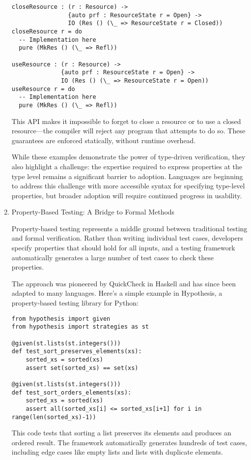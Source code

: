 \documentclass[11pt]{article}
\begin{document}
\begin{enumerate}
\begin{verbatim}
closeResource : (r : Resource) -> 
                {auto prf : ResourceState r = Open} -> 
                IO (Res () (\_ => ResourceState r = Closed))
closeResource r = do
  -- Implementation here
  pure (MkRes () (\_ => Refl))

useResource : (r : Resource) -> 
              {auto prf : ResourceState r = Open} -> 
              IO (Res () (\_ => ResourceState r = Open))
useResource r = do
  -- Implementation here
  pure (MkRes () (\_ => Refl))
\end{verbatim}

This API makes it impossible to forget to close a resource or to use a closed resource—the compiler will reject any program that attempts to do so. These guarantees are enforced statically, without runtime overhead.

While these examples demonstrate the power of type-driven verification, they also highlight a challenge: the expertise required to express properties at the type level remains a significant barrier to adoption. Languages are beginning to address this challenge with more accessible syntax for specifying type-level properties, but broader adoption will require continued progress in usability.
\item Property-Based Testing: A Bridge to Formal Methods
\label{sec:org481d371}

Property-based testing represents a middle ground between traditional testing and formal verification. Rather than writing individual test cases, developers specify properties that should hold for all inputs, and a testing framework automatically generates a large number of test cases to check these properties.

The approach was pioneered by QuickCheck in Haskell and has since been adapted to many languages. Here's a simple example in Hypothesis, a property-based testing library for Python:

\begin{verbatim}
from hypothesis import given
from hypothesis import strategies as st

@given(st.lists(st.integers()))
def test_sort_preserves_elements(xs):
    sorted_xs = sorted(xs)
    assert set(sorted_xs) == set(xs)

@given(st.lists(st.integers()))
def test_sort_orders_elements(xs):
    sorted_xs = sorted(xs)
    assert all(sorted_xs[i] <= sorted_xs[i+1] for i in range(len(sorted_xs)-1))
\end{verbatim}

This code tests that sorting a list preserves its elements and produces an ordered result. The framework automatically generates hundreds of test cases, including edge cases like empty lists and lists with duplicate elements.


\end{enumerate}
\end{document}
